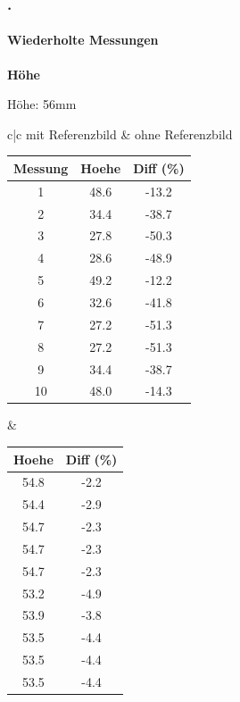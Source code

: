 \documentclass[xcolor=dvipsnames]{beamer}
\def\frametitlesec{\frametitle{\arabic{section}.\hspace{0.5ex}\insertsection}}
\def\framesubtitles#1{\framesubtitle{\hspace{3.5ex}#1}}
\begin{document}
\begin{frame}
	\frametitlesec
	\framesubtitles{Wiederholte Messungen}

	\textbf{Höhe}

	Höhe: 56mm
	\vfill

	\begin{tabular}{c|c}
		mit Referenzbild & ohne Referenzbild\\

		\begin{tabular}{c|c|c}
			Messung & Hoehe & Diff (\%) \\ \hline
			1 & 48.6 & -13.2 \\
			2 & 34.4 & -38.7 \\
			3 & 27.8 & -50.3 \\
			4 & 28.6 & -48.9 \\
			5 & 49.2 & -12.2 \\
			6 & 32.6 & -41.8 \\
			7 & 27.2 & -51.3 \\
			8 & 27.2 & -51.3 \\
			9 & 34.4 & -38.7 \\
			10 & 48.0 & -14.3
		\end{tabular} &

		\begin{tabular}{c|c}
			Hoehe & Diff (\%) \\ \hline
			 54.8 &  -2.2 \\
			 54.4 &  -2.9 \\
			 54.7 &  -2.3 \\
			 54.7 &  -2.3 \\
			 54.7 &  -2.3 \\
			 53.2 &  -4.9 \\
			 53.9 &  -3.8 \\
			 53.5 &  -4.4 \\
			 53.5 &  -4.4 \\
			 53.5 & -4.4
		\end{tabular}

	\end{tabular}

\end{frame}
\end{document}
